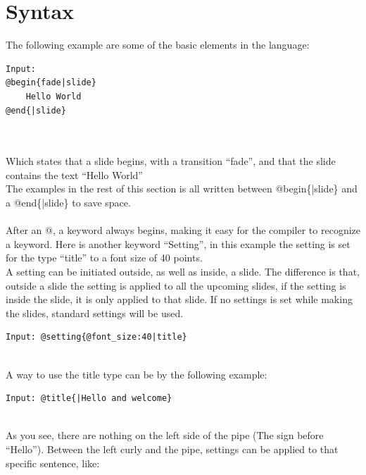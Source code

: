 \chapter{Syntax}
\label{SSyntax}
The following example are some of the basic elements in the language:
\begin{verbatim}
Input:
@begin{fade|slide}
    Hello World
@end{|slide}
\end{verbatim}

\\ \\
Which states that a slide begins, with a transition ``fade'', and that the slide contains the text ``Hello World'' \\
The examples in the rest of this section is all written between @begin\{|slide\} and a @end\{|slide\} to save space.
\\ \\
After an @, a keyword always begins, making it easy for the compiler to recognize a keyword.
Here is another keyword ``Setting'', in this example the setting is set for the type ``title'' to a font size of 40 points. \\
A setting can be initiated outside, as well as inside, a slide. The difference is that, outside a slide the setting is applied to all the upcoming slides, if the setting is inside the slide, it is only applied to that slide. If no settings is set while making the slides, standard settings will be used.

\begin{verbatim}
Input: @setting{@font_size:40|title}
\end{verbatim}

 \\

A way to use the title type can be by the following example:\\

\begin{verbatim}
Input: @title{|Hello and welcome}
\end{verbatim}

\\

As you see, there are nothing on the left side of the pipe (The sign before ``Hello''). Between the left curly and the pipe, settings can be applied to that specific sentence, like:\\

